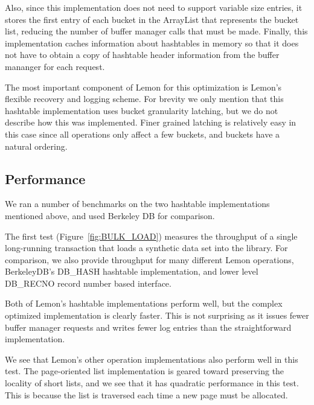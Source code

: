 \documentclass[letterpaper,twocolumn,english]{article}
\newcommand{\yad}{Lemon\xspace}
\begin{document}
Also, since this implementation does not need to support variable size
entries, it stores the first entry of each bucket in the ArrayList
that represents the bucket list, reducing the number of buffer manager
calls that must be made.  Finally, this implementation caches
information about hashtables in memory so that it does not have to 
obtain a copy of hashtable
header information from the buffer mananger for each request.

The most important component of \yad for this optimization is \yad's
flexible recovery and logging scheme.  For brevity we only mention
that this hashtable implementation uses bucket granularity latching, 
but we do not describe how this was implemented.  Finer grained
latching is relatively easy in this case since all operations only 
affect a few buckets, and buckets have a natural ordering.

\subsection{Performance}

We ran a number of benchmarks on the two hashtable implementations
mentioned above, and used Berkeley DB for comparison.


The first test (Figure~\ref{fig:BULK_LOAD}) measures the throughput of
a single long-running
transaction that loads a synthetic data set into the
library.  For comparison, we also provide throughput for many different
\yad operations, BerkeleyDB's DB\_HASH hashtable implementation,
and lower level DB\_RECNO record number based interface.  

Both of \yad's hashtable implementations perform well, but the complex
optimized implementation is clearly faster.  This is not surprising as
it issues fewer buffer manager requests and writes fewer log entries
than the straightforward implementation.

We see that \yad's other operation implementations also perform well
in this test.  The page-oriented list implementation is geared toward
preserving the locality of short lists, and we see that it has
quadratic performance in this test.  This is because the list is
traversed each time a new page must be allocated.  
\end{document}

